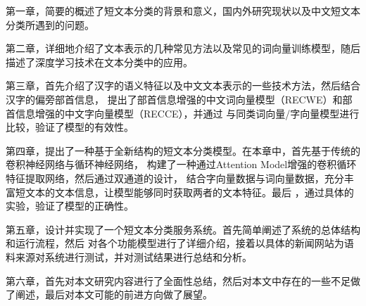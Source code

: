 \documentclass{standalone}
\begin{document}
第一章，简要的概述了短文本分类的背景和意义，国内外研究现状以及中文短文本分类所遇到的问题。

第二章，详细地介绍了文本表示的几种常见方法以及常见的词向量训练模型，随后描述了深度学习技术在文本分类中的应用。

第三章，首先介绍了汉字的语义特征以及中文文本表示的一些技术方法，然后结合汉字的偏旁部首信息，
提出了部首信息增强的中文词向量模型（RECWE）和部首信息增强的中文字向量模型（RECCE），并通过
与同类词向量/字向量模型进行比较，验证了模型的有效性。

第四章，提出了一种基于全新结构的短文本分类模型。在本章中，首先基于传统的卷积神经网络与循环神经网络，
构建了一种通过Attention Model增强的卷积循环特征提取网络，然后通过双通道的设计，
结合字向量数据与词向量数据，充分丰富短文本的文本信息，让模型能够同时获取两者的文本特征。最后
，通过具体的实验，验证了模型的正确性。

第五章，设计并实现了一个短文本分类服务系统。首先简单阐述了系统的总体结构和运行流程，然后
对各个功能模型进行了详细介绍，接着以具体的新闻网站为语料来源对系统进行测试，并对测试结果进行总结和分析。

第六章，首先对本文研究内容进行了全面性总结，然后对本文中存在的一些不足做了阐述，最后对本文可能的前进方向做了展望。
\end{document}
